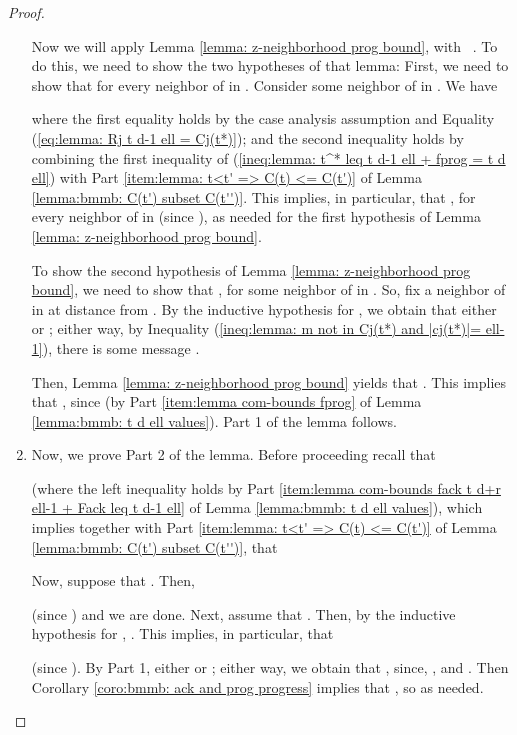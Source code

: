 \begin{proof}
\begin{enumerate}
Now we will apply Lemma \ref{lemma: z-neighborhood prog bound}, with ~.
To do this, we need to show the two hypotheses of that lemma:
First, we
need to show that  for every neighbor  of  in .
Consider some neighbor  of  in .
We have

where the first equality holds by the case analysis assumption and Equality (\ref{eq:lemma: Rj t d-1 ell = Cj(t*)});
and the second inequality holds by combining the first inequality of
(\ref{ineq:lemma: t^* leq t d-1 ell + fprog = t d ell})
with
Part \ref{item:lemma: t<t' => C(t) <= C(t')}
of Lemma \ref{lemma:bmmb: C(t') subset C(t'')}.
This implies, in particular, that
, for every neighbor  of  in  (since ), as needed for the first hypothesis of Lemma \ref{lemma: z-neighborhood prog bound}.


To show the second hypothesis of Lemma \ref{lemma: z-neighborhood prog bound},
we need to show that
, for some neighbor  of  in .
So, fix a neighbor  of  in  at distance  from .
By the inductive hypothesis for ,
we obtain that either  or ;
either way,
by Inequality
(\ref{ineq:lemma: m not in Cj(t*) and |cj(t*)|= ell-1}),
there is some message .




Then, Lemma \ref{lemma: z-neighborhood prog bound}
yields that .
This implies that , since 
(by Part \ref{item:lemma com-bounds fprog}
of Lemma \ref{lemma:bmmb: t d ell values}).
Part 1 of the lemma follows.




\item Now, we prove Part 2 of the lemma.
Before proceeding recall that

(where the left inequality holds
by Part
\ref{item:lemma com-bounds fack t d+r ell-1 + Fack leq t d-1 ell}
of Lemma
\ref{lemma:bmmb: t d ell values}), which implies together with
Part \ref{item:lemma: t<t' => C(t) <= C(t')}
of Lemma \ref{lemma:bmmb: C(t') subset C(t'')}, that

Now, suppose that .
Then,

(since ) and we are done.
Next, assume that .
Then,  by the inductive hypothesis for , .
This implies, in particular, that

(since ).
By Part 1, either  or ;
either way, we obtain that , since, ,  and .
Then Corollary \ref{coro:bmmb: ack and prog progress} implies that
, so
 as needed.

\end{enumerate}
\end{proof}



